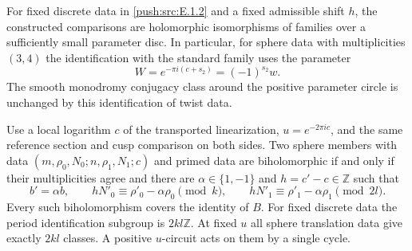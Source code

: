
\begin{corollary}\hypertarget{tag-032T}{}\label{push:src:E.1.3}


For fixed discrete data in \ref{push:src:E.1.2} and a fixed admissible shift $h$,
the constructed comparisons are holomorphic isomorphisms of families
over a sufficiently small parameter disc.  In particular, for sphere
data with multiplicities $(3,4)$ the identification with the standard
family uses the parameter
\[
 W=e^{-\pi i(c+s_2)}=(-1)^{s_2}w.
\]
The smooth monodromy conjugacy class around the positive parameter
circle is unchanged by this identification of twist data.
\end{corollary}

\begin{theorem}\hypertarget{tag-032S}{}\label{push:src:E.1.2}


Use a local logarithm $c$ of the transported linearization,
$u=e^{-2\pi i c}$, and the same reference section and cusp comparison
on both sides.  Two sphere members with data
$(m,\rho_0,N_0;n,\rho_1,N_1;c)$ and primed data are biholomorphic
if and only if their multiplicities agree and there are
$\alpha\in\{1,-1\}$ and $h=c'-c\in\mathbb Z$ such that
\[
 b'=\alpha b,\qquad
 hN'_0\equiv\rho'_0-\alpha\rho_0\pmod{k},\qquad
 hN'_1\equiv\rho'_1-\alpha\rho_1\pmod{2l}.
\]
Every such biholomorphism covers the identity of $B$.
For fixed discrete data the period identification subgroup is
$2kl\mathbb Z$.  At fixed $u$ all sphere translation data give
exactly $2kl$ classes.  A positive $u$-circuit acts on them by a
single cycle.
\end{theorem}

